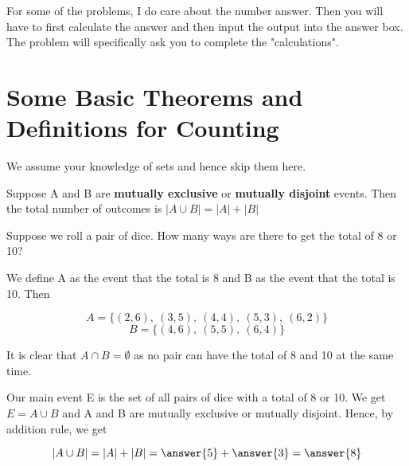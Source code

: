 \documentclass{ximera}
\begin{document}
\hspace{1cm}

For some of the problems, I do care about the number answer. Then you will have to first calculate the answer and then input the output into the answer box. The problem will specifically ask you to complete the "calculations".

\section*{Some Basic Theorems and Definitions for Counting}

We assume your knowledge of sets and hence skip them here.

\begin{theorem}
Suppose A and B are \textbf{mutually exclusive} or \textbf{mutually disjoint}  events. Then the total number of outcomes is $|A\cup B|=|A|+|B|$
\end{theorem}

\begin{example}
Suppose we roll a pair of dice. How many ways are there to get the total of 8 or 10?

\begin{explanation}
We define A as the event that the total is 8 and B as the event that the total is 10. Then 

$$A=\{(2,6),~(3,5),~(4,4),~(5,3),~(6,2)\}$$
$$B=\{(4,6),~(5,5),~(6,4)\}$$

It is clear that $A\cap B=\emptyset$ as no pair can have the total of 8 and 10 at the same time.

Our main event E is the set of all pairs of dice with a total of 8 or 10. We get $E=A\cup B$ and A and B are mutually exclusive or mutually disjoint. Hence, by addition rule, we get

$$|A\cup B|=|A|+|B|=\answer{5}+\answer{3}=\answer{8}$$


\end{explanation}
\end{example}
\end{document}
